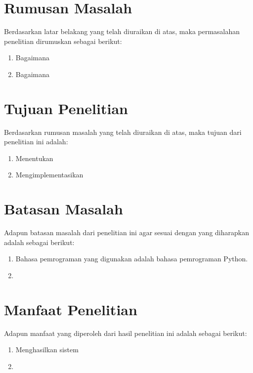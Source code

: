 \section{Rumusan Masalah} \label{I.Rumusan Masalah}

Berdasarkan latar belakang yang telah diuraikan di atas, maka permasalahan penelitian dirumuskan sebagai berikut: \par

\begin{enumerate}[noitemsep]
	\item Bagaimana
	\item Bagaimana 
\end{enumerate}


\section{Tujuan Penelitian} \label{I.Tujuan}
Berdasarkan rumusan masalah yang telah diuraikan di atas, maka tujuan dari penelitian ini adalah: \par

\begin{enumerate}[noitemsep]
	\item Menentukan 
	\item Mengimplementasikan
\end{enumerate}


\section{Batasan Masalah} \label{I.Batasan}
Adapun batasan masalah dari penelitian ini agar sesuai dengan yang diharapkan adalah sebagai berikut: \par

\begin{enumerate}[noitemsep]
    \item Bahasa pemrograman yang digunakan adalah bahasa pemrograman Python.
    \item 
\end{enumerate}


\section{Manfaat Penelitian} \label{I.Manfaat}
Adapun manfaat yang diperoleh dari hasil penelitian ini adalah sebagai berikut: \par

\begin{enumerate}[noitemsep]
    \item Menghasilkan sistem 
    \item 
\end{enumerate}



